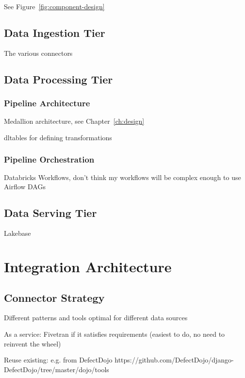 See Figure~\ref{fig:component-design}



\subsection{Data Ingestion Tier}

The various connectors

\subsection{Data Processing Tier}

\subsubsection{Pipeline Architecture}

Medallion architecture, see Chapter~\ref{ch:design}

\gls{dltables} for defining transformations

\subsubsection{Pipeline Orchestration}

Databricks Workflows, don't think my workflows will be complex enough to use Airflow DAGs

\subsection{Data Serving Tier}

Lakebase

\section{Integration Architecture}


\subsection{Connector Strategy}

Different patterns and tools optimal for different data sources

As a service: Fivetran if it satisfies requirements (easiest to do, no need to reinvent the wheel)

Reuse existing: e.g. from DefectDojo https://github.com/DefectDojo/django-DefectDojo/tree/master/dojo/tools

